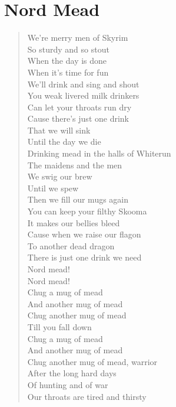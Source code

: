 \documentclass[11pt]{article}
\begin{document}
\section{Nord Mead}
\label{sec:org83bba2b}
\begin{verse}
We're merry men of Skyrim\\
So sturdy and so stout\\
When the day is done\\
When it's time for fun\\
We'll drink and sing and shout\\
\vspace*{1em}
You weak livered milk drinkers\\
Can let your throats run dry\\
Cause there's just one drink\\
That we will sink\\
Until the day we die\\
Drinking mead in the halls of Whiterun\\
The maidens and the men\\
We swig our brew\\
Until we spew\\
Then we fill our mugs again\\
\vspace*{1em}
You can keep your filthy Skooma\\
It makes our bellies bleed\\
Cause when we raise our flagon\\
To another dead dragon\\
There is just one drink we need\\
Nord mead!\\
Nord mead!\\
\vspace*{1em}
Chug a mug of mead\\
And another mug of mead\\
Chug another mug of mead\\
Till you fall down\\
Chug a mug of mead\\
And another mug of mead\\
Chug another mug of mead, warrior\\
\vspace*{1em}
After the long hard days\\
Of hunting and of war\\
Our throats are tired and thirsty\\

\end{verse}
\end{document}
